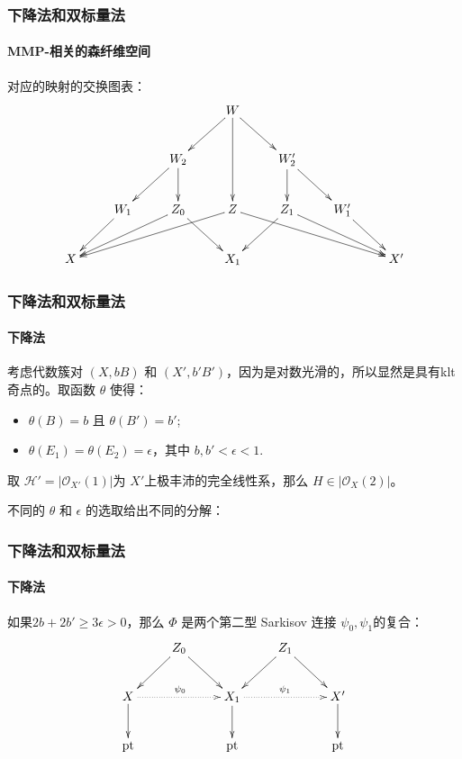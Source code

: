 \documentclass[10pt]{ctexbeamer}
\begin{document}
\begin{frame}[shrink]
  \frametitle{下降法和双标量法}
  \framesubtitle{MMP-相关的森纤维空间}
对应的映射的交换图表：
\[\xymatrix{
         &            &                    & W\ar[dd]\ar[rd]\ar[ld]\\
         &            & W_2\ar[ld]\ar[d]   &                          & W_2'\ar[rd]\ar[d]\\
         & W_1\ar[ld] & Z_0\ar[lld]\ar[rd] & Z\ar[llld]\ar[rrrd]      & Z_1\ar[ld]\ar[rrd]  & W_1'\ar[rd]\\
    X  &            &                    & X_1                      &                     &               & X'
} \]

\end{frame}


\begin{frame}[shrink]
  \frametitle{下降法和双标量法}
  \framesubtitle{下降法}
考虑代数簇对 $ (X,bB) $ 和 $ (X',b'B') $，因为是对数光滑的，所以显然是具有klt奇点的。取函数 $\theta$ 使得：
\begin{itemize}
  \item $\theta(B)=b$ 且 $\theta(B')=b'$;
  \item $\theta(E_{1})=\theta(E_{2})=\epsilon$，其中 $b,b'<\epsilon<1$.
\end{itemize}

  \pause
取 $ \mathcal{H}'=|\mathcal{O}_{X'}(1)| $为 $X'$上极丰沛的完全线性系，那么 $H\in |\mathcal{O}_{X}(2)|$。

  \pause
不同的 $\theta$ 和  $\epsilon$ 的选取给出不同的分解：
\end{frame}

\begin{frame}[shrink]
  \frametitle{下降法和双标量法}
  \framesubtitle{下降法}
  如果$ 2b+2b'\geqslant 3\epsilon>0 $，那么  $\Phi$ 是两个第二型 Sarkisov 连接 $\psi_{0},\psi_{1}$的复合： 
    \[ \xymatrix{
        &Z_{0}\ar[rd]\ar[ld] & &Z_{1}\ar[rd]\ar[ld]\\
        X\ar[d]\ar@{.>}[rr]^{\psi_{0}}& &X_{1}\ar@{.>}[rr]^{\psi_{1}}\ar[d]&&X'\ar[d]\\
        \text{pt}&&\text{pt}&&\text{pt} } \]
\end{frame}
\end{document}
